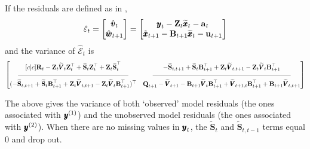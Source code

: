 \documentclass[]{article}
\def\UPS{\mbox{\boldmath $\Upsilon$}}
\def\XI{\mbox{\boldmath $\Xi$}}
\def\BB{\mbox{$\mathbf B$}}	\def\bb{\mbox{$\mathbf b$}} \def\Bb{\mbox{$\mathbf J$}} \def\Ba{\mbox{$\mathbf L$}} \def\Bm{\UPS}
\def\QQ{\mbox{$\mathbf Q$}}	 \def\qq{\mbox{$\mathbf q$}} \def\Qb{\mbox{$\mathbf G$}}  \def\Qm{\mathbb{Q}}
\def\RR{\mbox{$\mathbf R$}}	 \def\rr{\mbox{$\mathbf r$}} \def\Rb{\mbox{$\mathbf H$}}	\def\Rm{\mathbb{R}}
\def\Ss{\mbox{$\mathbf S$}}
\def\VV{\mbox{$\pmb{V}$}}	\def\vv{\mbox{$\pmb{v}$}}
\def\ZZ{\mbox{$\mathbf Z$}}	\def\zz{\mbox{$\mathbf z$}}	\def\Zb{\mbox{$\mathbf M$}} \def\Za{\mbox{$\mathbf N$}} \def\Zm{\XI}
\def\hatxt{\widetilde{\xx}_t}
\def\hatVt{\widetilde{\VV}_t}
\def\hatSt{\widetilde{\Ss}_t}
\def\hatSttm{\widetilde{\Ss}_{t,t-1}}
\def\hatSttp{\widetilde{\Ss}_{t,t+1}}
\begin{document}
If the residuals are defined as in \citet{Harveyetal1998},
\begin{equation}
\hat{\varepsilon}_t = \begin{bmatrix}\hat{\vv}_t\\ \hat{\ww}_{t+1}\end{bmatrix} =
\begin{bmatrix}\yy_t - \ZZ_t\hatxt-\aa_t\\ \tilde{\xx}_{t+1} - \BB_{t+1}\hatxt-\uu_{t+1} \end{bmatrix}
\end{equation}
and the variance of $\hat{\mathcal{E}}_t$ is
\begin{equation}\label{eqn:jointcondresid2}
\begin{bmatrix}[c|c]
\RR_t - \ZZ_t \hatVt \ZZ_t^\top + \hatSt\ZZ_t^\top + \ZZ_t\hatSt^\top&
- \hatSttp + \hatSt\BB_{t+1}^\top + \ZZ_t\widetilde{\VV}_{t,t+1} - \ZZ_t\hatVt\BB_{t+1}^\top \\
\rule[.5ex]{40ex}{0.25pt} & \rule[.5ex]{50ex}{0.25pt} \\
(- \hatSttp + \hatSt\BB_{t+1}^\top + \ZZ_t\widetilde{\VV}_{t,t+1} - \ZZ_t\hatVt\BB_{t+1}^\top)^\top& 
\QQ_{t+1} - \widetilde{\VV}_{t+1} - \BB_{t+1} \hatVt \BB_{t+1}^\top + \widetilde{\VV}_{t+1,t} \BB_{t+1}^\top + \BB_{t+1}\widetilde{\VV}_{t,t+1} \end{bmatrix}
\end{equation}

The above gives the variance of both `observed' model residuals (the ones associated with $\mbox{$\pmb{y}$}^{(1)}$) and the unobserved model residuals (the ones associated with $\mbox{$\pmb{y}$}^{(2)}$).  
When there are no missing values in $\mbox{$\pmb{y}$}_t$, the $\hatSt$ and $\hatSttm$ terms equal 0 and drop out.
\end{document}
